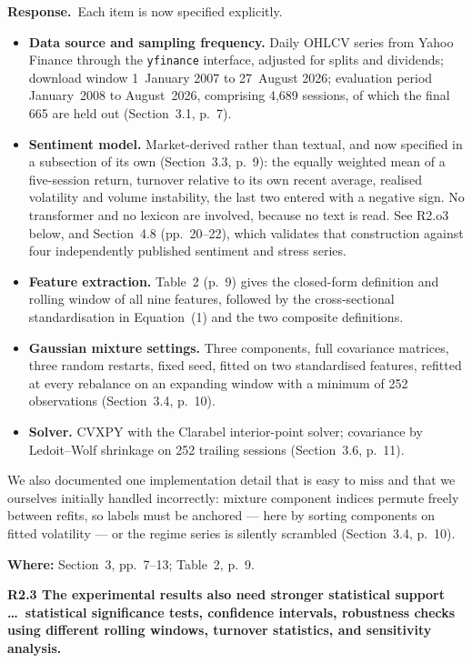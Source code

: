 \documentclass[11pt,a4paper]{article}
\newcommand{\rc}[1]{\par\medskip\noindent\textbf{#1}\par\nopagebreak}
\newcommand{\resp}{\par\noindent\textbf{Response.}\ }
\newcommand{\where}[1]{\par\smallskip\noindent\textcolor{blue!55!black}{\textbf{Where:} #1}\par}
\begin{document}
\resp Each item is now specified explicitly.

\begin{itemize}
\item \textbf{Data source and sampling frequency.} Daily OHLCV series from Yahoo Finance
through the \texttt{yfinance} interface, adjusted for splits and dividends; download
window 1~January 2007 to 27~August 2026; evaluation period January~2008 to
August~2026, comprising 4{,}689 sessions, of which the final 665 are held out
(Section~3.1, p.~7).
\item \textbf{Sentiment model.} Market-derived rather than textual, and now specified
in a subsection of its own (Section~3.3, p.~9): the equally weighted mean of a
five-session return, turnover relative to its own recent average, realised volatility and
volume instability, the last two entered with a negative sign. No transformer and no
lexicon are involved, because no text is read. See R2.o3 below, and Section~4.8
(pp.~20--22), which validates that construction against four independently published
sentiment and stress series.
\item \textbf{Feature extraction.} Table~2 (p.~9) gives the closed-form definition and
rolling window of all nine features, followed by the cross-sectional standardisation in
Equation~(1) and the two composite definitions.
\item \textbf{Gaussian mixture settings.} Three components, full covariance matrices,
three random restarts, fixed seed, fitted on two standardised features, refitted at
every rebalance on an expanding window with a minimum of 252 observations
(Section~3.4, p.~10).
\item \textbf{Solver.} CVXPY with the Clarabel interior-point solver; covariance by
Ledoit--Wolf shrinkage on 252 trailing sessions (Section~3.6, p.~11).
\end{itemize}

We also documented one implementation detail that is easy to miss and that we ourselves
initially handled incorrectly: mixture component indices permute freely between refits,
so labels must be anchored --- here by sorting components on fitted volatility --- or the
regime series is silently scrambled (Section~3.4, p.~10).
\where{Section~3, pp.~7--13; Table~2, p.~9.}

\rc{R2.3 The experimental results also need stronger statistical support \dots\
statistical significance tests, confidence intervals, robustness checks using different
rolling windows, turnover statistics, and sensitivity analysis.}
\end{document}
